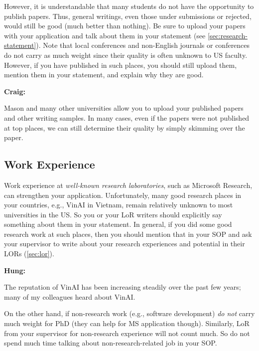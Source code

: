 \documentclass[oneside,11pt,dvipsnames]{book}
\newenvironment{commentbox}[1][]{
  \small
  \begin{mybox}
    {\small \textbf{#1}}
  }{
  \end{mybox}
}
\begin{document}
However, it is understandable that many students do not have the opportunity to publish papers. Thus, general writings, even those under submissions or rejected, would still be good (much better than nothing).  Be sure to upload your papers with your application and talk about them in your statement (see \autoref{sec:research-statement}).  Note that local conferences and non-English journals or conferences do
not carry as much weight since their quality is often unknown to US faculty. However, if you have published in such places, you should still upload them, mention them in your statement, and explain why they are good.




\begin{commentbox}[Craig:]
  Mason and many other universities allow you to upload your published papers and other writing samples. In many cases, even if the papers were not published at top places, we can still determine their quality by simply skimming over the paper.
\end{commentbox}

\subsection{Work Experience} Work experience at \emph{well-known research laboratories}, such as Microsoft Research, can strengthen your
application.  Unfortunately, many good research places in your countries, e.g., VinAI in Vietnam, remain relatively unknown to most universities in the US. So you or your LoR writers should explicitly say something about them in your statement.  In general, if you did some good research work at such places, then you should mention that in your SOP and ask your supervisor to write about your research experiences and potential in their LORs (\autoref{sec:lor}).


\begin{commentbox}[Hung:]
  The reputation of VinAI has been increasing steadily over the past few years; many of my colleagues heard about VinAI.
\end{commentbox}

On the other hand, if non-research work (e.g., software development) \emph{do not} carry much weight for PhD (they can help for MS application though). Similarly, LoR from your supervisor for non-research experience will not count much.
So do not spend much time talking about non-research-related job in your SOP.
\end{document}
